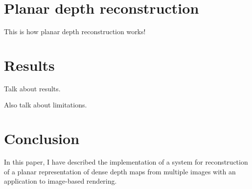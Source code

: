 \documentclass[conference]{acmsiggraph}
\begin{document}

\section{Planar depth reconstruction}

This is how planar depth reconstruction works!

\section{Results}

Talk about results.

Also talk about limitations.

\section{Conclusion}

In this paper, I have described the implementation of a system for
reconstruction of a planar representation of dense depth maps from multiple images
with an application to image-based rendering.



\end{document}
